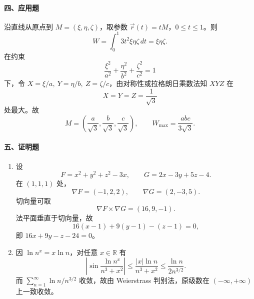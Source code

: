 \paragraph{四、应用题}
沿直线从原点到 $M=(\xi,\eta,\zeta)$，取参数 $\vec r(t)=tM$，$0\le t\le1$。则
\[
  W=\int_0^1 3t^2\xi\eta\zeta\,dt=\xi\eta\zeta.
\]
在约束
\[
  \frac{\xi^2}{a^2}+\frac{\eta^2}{b^2}+\frac{\zeta^2}{c^2}=1
\]
下，令 $X=\xi/a,\ Y=\eta/b,\ Z=\zeta/c$，由对称性或拉格朗日乘数法知 $XYZ$ 在
\[
  X=Y=Z=\frac1{\sqrt3}
\]
处最大。故
\[
  M=\left(\frac a{\sqrt3},\frac b{\sqrt3},\frac c{\sqrt3}\right),\qquad
  W_{\max}=\frac{abc}{3\sqrt3}.
\]

\paragraph{五、证明题}
\begin{enumerate}
  \item 设
  \[
    F=x^2+y^2+z^2-3x,\qquad G=2x-3y+5z-4.
  \]
  在 $(1,1,1)$ 处，
  \[
    \nabla F=(-1,2,2),\qquad \nabla G=(2,-3,5).
  \]
  切向量可取
  \[
    \nabla F\times\nabla G=(16,9,-1).
  \]
  法平面垂直于切向量，故
  \[
    16(x-1)+9(y-1)-(z-1)=0,
  \]
  即 $16x+9y-z-24=0$。
  \item 因 $\ln n^x=x\ln n$，对任意 $x\in\mathbb R$ 有
  \[
    \left|\sin\frac{\ln n^x}{n^3+x^2}\right|
    \le \frac{|x|\ln n}{n^3+x^2}
    \le \frac{\ln n}{2n^{3/2}}.
  \]
  而 $\sum_{n=1}^\infty \ln n/n^{3/2}$ 收敛，故由 Weierstrass 判别法，原级数在 $(-\infty,+\infty)$ 上一致收敛。
\end{enumerate}
